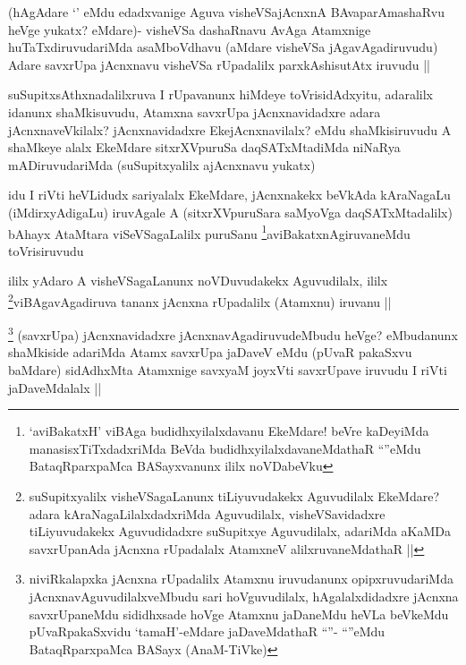 \begin{artha}
(hAgAdare `\stext' eMdu edadxvanige Aguva visheVSajAcnxnA BAvaparAmashaRvu heVge yukatx? eMdare)- visheVSa dashaRnavu AvAga Atamxnige huTaTxdiruvudariMda asaMboVdhavu (aMdare visheVSa jAgavAgadiruvudu) Adare savxrUpa jAcnxnavu visheVSa rUpadalilx parxkAshisutAtx iruvudu ||
\end{artha}

\begin{artha}
suSupitxsAthxnadalilxruva I rUpavanunx hiMdeye toVrisidAdxyitu, adaralilx idanunx shaMkisuvudu, Atamxna savxrUpa jAcnxnavidadxre adara jAcnxnaveVkilalx? jAcnxnavidadxre EkejAcnxnavilalx? eMdu shaMkisiruvudu A shaMkeye alalx EkeMdare sitxrXVpuruSa daqSATxMtadiMda niNaRya mADiruvudariMda (suSupitxyalilx ajAcnxnavu yukatx)
\end{artha}


\begin{artha}
idu I riVti heVLidudx sariyalalx EkeMdare, jAcnxnakekx beVkAda kAraNagaLu (iMdirxyAdigaLu) iruvAgale A (sitxrXVpuruSara saMyoVga daqSATxMtadalilx) bAhayx AtaMtara viSeVSagaLalilx puruSanu \footnote{`aviBakatxH' viBAga budidhxyilalxdavanu EkeMdare! beVre kaDeyiMda manasisxTiTxdadxriMda BeVda budidhxyilalxdavaneMdathaR ``\stext''eMdu BataqRparxpaMca BASayxvanunx ililx noVDabeVku}aviBakatxnAgiruvaneMdu toVrisiruvudu
\end{artha}

\begin{artha}
ililx yAdaro A visheVSagaLanunx noVDuvudakekx Aguvudilalx, ililx \footnote{suSupitxyalilx visheVSagaLanunx tiLiyuvudakekx Aguvudilalx EkeMdare? adara kAraNagaLilalxdadxriMda Aguvudilalx, visheVSavidadxre tiLiyuvudakekx Aguvudidadxre suSupitxye Aguvudilalx, adariMda aKaMDa savxrUpanAda jAcnxna rUpadalalx AtamxneV alilxruvaneMdathaR ||}viBAgavAgadiruva tananx jAcnxna rUpadalilx (Atamxnu) iruvanu ||
\end{artha}


\begin{artha}
\footnote{niviRkalapxka jAcnxna rUpadalilx Atamxnu iruvudanunx opipxruvudariMda jAcnxnavAguvudilalxveMbudu sari hoVguvudilalx, hAgalalxdidadxre jAcnxna savxrUpaneMdu sididhxsade hoVge Atamxnu jaDaneMdu heVLa beVkeMdu pUvaRpakaSxvidu `tamaH'-eMdare jaDaveMdathaR ``\stext''- ``\stext''eMdu BataqRparxpaMca BASayx (AnaM-TiVke)}
(savxrUpa) jAcnxnavidadxre jAcnxnavAgadiruvudeMbudu heVge? eMbudanunx shaMkiside adariMda Atamx savxrUpa jaDaveV eMdu (pUvaR pakaSxvu baMdare) sidAdhxMta Atamxnige savxyaM joyxVti savxrUpave iruvudu I riVti jaDaveMdalalx ||
\end{artha}

